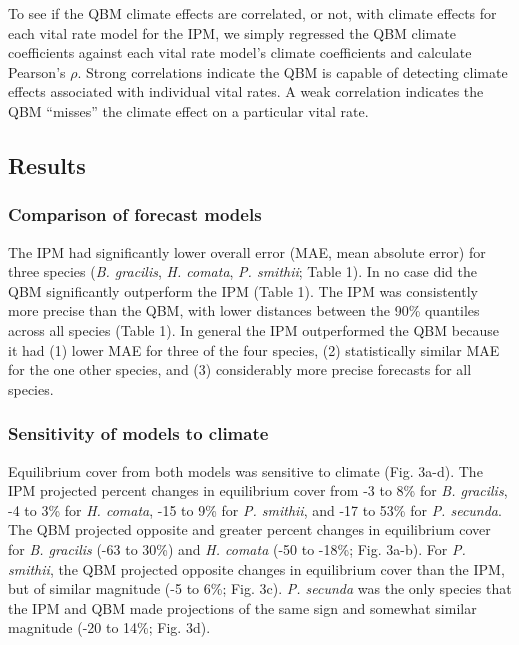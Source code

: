 \documentclass[12pt,]{article}
\begin{document}
To see if the QBM climate effects are correlated, or not, with climate
effects for each vital rate model for the IPM, we simply regressed the
QBM climate coefficients against each vital rate model's climate
coefficients and calculate Pearson's $\rho$. Strong correlations
indicate the QBM is capable of detecting climate effects associated with
individual vital rates. A weak correlation indicates the QBM ``misses''
the climate effect on a particular vital rate.

\subsection{Results}\label{results}

\subsubsection{Comparison of forecast
models}\label{comparison-of-forecast-models}

The IPM had significantly lower overall error (MAE, mean absolute error)
for three species (\emph{B. gracilis}, \emph{H. comata}, \emph{P.
smithii}; Table 1). In no case did the QBM significantly outperform the
IPM (Table 1). The IPM was consistently more precise than the QBM, with
lower distances between the 90\% quantiles across all species (Table 1).
In general the IPM outperformed the QBM because it had (1) lower MAE for
three of the four species, (2) statistically similar MAE for the one
other species, and (3) considerably more precise forecasts for all
species.

\subsubsection{Sensitivity of models to
climate}\label{sensitivity-of-models-to-climate}

Equilibrium cover from both models was sensitive to climate (Fig. 3a-d).
The IPM projected percent changes in equilibrium cover from -3 to 8\%
for \emph{B. gracilis}, -4 to 3\% for \emph{H. comata}, -15 to 9\% for
\emph{P. smithii}, and -17 to 53\% for \emph{P. secunda}. The QBM
projected opposite and greater percent changes in equilibrium cover for
\emph{B. gracilis} (-63 to 30\%) and \emph{H. comata} (-50 to -18\%;
Fig. 3a-b). For \emph{P. smithii}, the QBM projected opposite changes in
equilibrium cover than the IPM, but of similar magnitude (-5 to 6\%;
Fig. 3c). \emph{P. secunda} was the only species that the IPM and QBM
made projections of the same sign and somewhat similar magnitude (-20 to
14\%; Fig. 3d).
\end{document}
